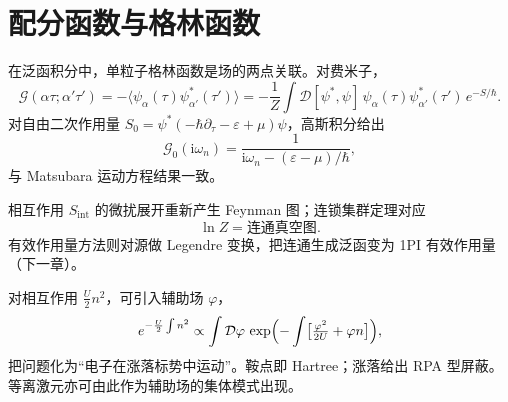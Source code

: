 \section{配分函数与格林函数}

在泛函积分中，单粒子格林函数是场的两点关联。对费米子，
\begin{equation}
  \mathcal{G}(\alpha\tau;\alpha'\tau')
  =-\bigl\langle\psi_\alpha(\tau)\psi_{\alpha'}^*(\tau')\bigr\rangle
  =-\frac{1}{Z}
  \int\mathcal{D}[\psi^*,\psi]\,
  \psi_\alpha(\tau)\psi_{\alpha'}^*(\tau')\,
  e^{-S/\hbar}.
\end{equation}
对自由二次作用量 $S_0=\psi^*(-\hbar\partial_\tau-\varepsilon+\mu)\psi$，高斯积分给出
\begin{equation}
  \mathcal{G}_0(\mathrm{i}\omega_n)
  =\frac{1}{\mathrm{i}\omega_n-(\varepsilon-\mu)/\hbar},
\end{equation}
与 Matsubara 运动方程结果一致。

相互作用 $S_{\mathrm{int}}$ 的微扰展开重新产生 Feynman 图；连锁集群定理对应
\begin{equation}
  \ln Z=\text{连通真空图}.
\end{equation}
有效作用量方法则对源做 Legendre 变换，把连通生成泛函变为 1PI 有效作用量（下一章）。

\begin{example}
对相互作用 $\frac{U}{2}n^2$，可引入辅助场 $\varphi$，
\begin{equation}
  e^{-\frac{U}{2}\int n^2}
  \propto
  \int\mathcal{D}\varphi\,
  \exp\Bigl(
  -\int\bigl[\tfrac{\varphi^2}{2U}+\varphi n\bigr]
  \Bigr),
\end{equation}
把问题化为“电子在涨落标势中运动”。鞍点即 Hartree；涨落给出 RPA 型屏蔽。等离激元亦可由此作为辅助场的集体模式出现。
\end{example}
